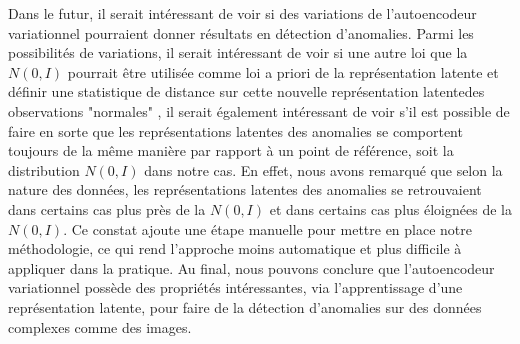 Dans le futur, il serait intéressant de voir si des variations de l'autoencodeur variationnel pourraient donner \DIFdelbegin {}\DIFdelend \DIFaddbegin {}\DIFaddend résultats \DIFdelbegin {}\DIFdelend en détection d'anomalies. Parmi les possibilités de variations, il serait intéressant de voir si une autre loi que la $N(0,I)$ pourrait être utilisée comme loi a priori de la représentation latente et définir une statistique de distance sur cette nouvelle représentation latente\DIFdelbegin {}\DIFdelend \DIFaddbegin {}\DIFaddend des observations "normales" \DIFdelbegin {}\DIFdelend \DIFaddbegin {}\DIFaddend , il serait également intéressant de voir s'il est possible de faire en sorte que les représentations latentes des anomalies se comportent toujours de la même manière par rapport à un point de référence, soit la distribution $N(0,I)$ dans notre cas. En effet, nous avons remarqué que selon la nature des données, les représentations latentes des anomalies se retrouvaient dans certains cas plus près de la $N(0,I)$ et dans certains cas  plus éloignées de la $N(0,I)$. Ce constat ajoute une étape manuelle pour mettre en place notre méthodologie, ce qui rend l'approche moins automatique et plus difficile à appliquer dans la pratique. Au final, nous pouvons conclure que l'autoencodeur variationnel possède des propriétés intéressantes, via l'apprentissage d'une représentation latente, pour faire de la détection d'anomalies sur des données complexes comme des images.


